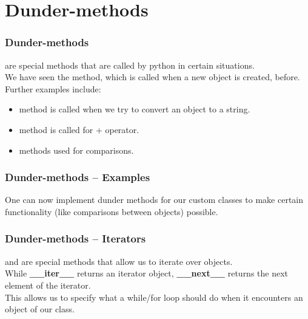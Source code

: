 \documentclass{beamer}
\begin{document}
\section{Dunder-methods}
\begin{frame}
  \frametitle{Dunder-methods}
  \textbf{} are special methods that are called by python in certain situations.\\
  \vspace{5mm}
  We have seen the \textbf{} method, which is called when a new object is created, before.\\
  Further examples include: 
  \begin{itemize}
    \item \textbf{} method is called when we try to convert an object to a string.\\
    \item \textbf{} method is called for + operator.\\
    \item  \textbf{} methods used for comparisons. 
  \end{itemize}
\end{frame}
\begin{frame}
  \frametitle{Dunder-methods -- Examples}
  One can now implement dunder methods for our custom classes to make certain functionality (like comparisons between objects) possible.\\
  
\end{frame}
\begin{frame}
  \frametitle{Dunder-methods -- Iterators}
  \textbf{} and \textbf{} are special methods that allow us to iterate over objects.\\
  \vspace{5mm}
  While \textbf{\_\_iter\_\_} returns an iterator object, \textbf{\_\_next\_\_} returns the next element of the iterator.\\
  \vspace{5mm}
  This allows us to specify what a while/for loop should do when it encounters an object of our class.\\
\end{frame}
\end{document}
